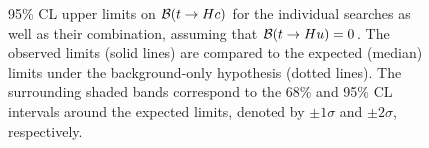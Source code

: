 \begin{figure}[h!]
\begin{center}
\caption{\small {95\% CL upper limits on $\mathcal{B}(t\to Hc)$ for the individual searches as well as their
combination, assuming that $\mathcal{B}(t\to Hu)=0$. The observed limits (solid lines) are compared to the 
expected (median) limits under the background-only
hypothesis (dotted lines). The surrounding shaded bands correspond to the 68\% and 95\% CL intervals around the expected limits, 
denoted by $\pm 1\sigma$ and $\pm 2\sigma$, respectively.
}}
\label{fig:limits_combo_1D_hc} 
\end{center}
\end{figure}

